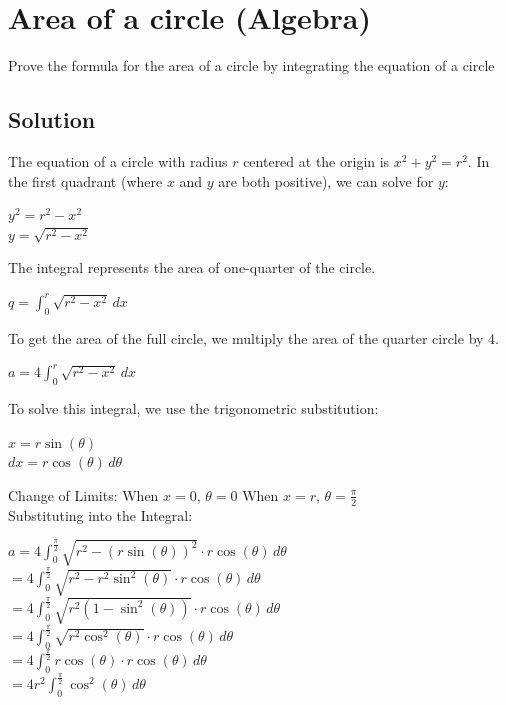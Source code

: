 \section {Area of a circle (Algebra)}

Prove the formula for the area of a circle by integrating the equation of a circle

\subsection{Solution}
The equation of a circle with radius $r$ centered at the origin is $x^2 + y^2 = r^2$.
In the first quadrant (where $x$ and $y$ are both positive), we can solve for $y$:
\begin{center}
$y^2 = r^2 - x^2$
\\
$y = \sqrt{r^2 - x^2}$
\end{center}
The integral represents the area of one-quarter of the circle.
\begin{center}
$q = \int_0^r \sqrt{r^2 - x^2} \, dx$
\end{center}
To get the area of the full circle, we multiply the area of the quarter circle by 4.
\begin{center}
$a = 4 \int_0^r \sqrt{r^2 - x^2} \, dx$
\end{center}
To solve this integral, we use the trigonometric substitution:
\begin{center}
$x = r \sin(\theta)$
\\
$dx = r \cos(\theta) \, d\theta$
\end{center}
Change of Limits:
When $x = 0$, $\theta = 0$
When $x = r$, $\theta = \frac{\pi}{2}$
\\
Substituting into the Integral:
\begin{center}
$a = 4 \int_0^{\frac{\pi}{2}} \sqrt{r^2 - (r \sin(\theta))^2} \cdot r \cos(\theta) \, d\theta$
\\
$= 4 \int_0^{\frac{\pi}{2}} \sqrt{r^2 - r^2 \sin^2(\theta)} \cdot r \cos(\theta) \, d\theta$
\\
$= 4 \int_0^{\frac{\pi}{2}} \sqrt{r^2 (1 - \sin^2(\theta))} \cdot r \cos(\theta) \, d\theta$
\\
$= 4 \int_0^{\frac{\pi}{2}} \sqrt{r^2 \cos^2(\theta)} \cdot r \cos(\theta) \, d\theta$
\\
$= 4 \int_0^{\frac{\pi}{2}} r \cos(\theta) \cdot r \cos(\theta) \, d\theta$
\\
$= 4r^2 \int_0^{\frac{\pi}{2}} \cos^2(\theta) \, d\theta$
\end{center}
